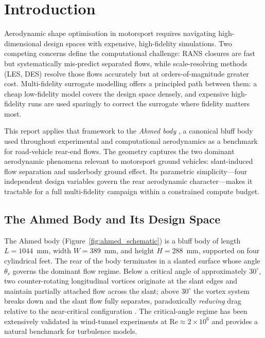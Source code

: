 \section{Introduction}
\label{sec:introduction}

Aerodynamic shape optimisation in motorsport requires navigating high-dimensional design spaces with expensive, high-fidelity simulations. Two competing concerns define the computational challenge: RANS closures are fast but systematically mis-predict separated flows, while scale-resolving methods (LES, DES) resolve those flows accurately but at orders-of-magnitude greater cost. Multi-fidelity surrogate modelling offers a principled path between them: a cheap low-fidelity model covers the design space densely, and expensive high-fidelity runs are used sparingly to correct the surrogate where fidelity matters most.

This report applies that framework to the \emph{Ahmed body} \cite{ahmed1984}, a canonical bluff body used throughout experimental and computational aerodynamics as a benchmark for road-vehicle rear-end flows. The geometry captures the two dominant aerodynamic phenomena relevant to motorsport ground vehicles: slant-induced flow separation and underbody ground effect. Its parametric simplicity---four independent design variables govern the rear aerodynamic character---makes it tractable for a full multi-fidelity campaign within a constrained compute budget.

\subsection{The Ahmed Body and Its Design Space}

The Ahmed body (Figure~\ref{fig:ahmed_schematic}) is a bluff body of length $L = 1044$~mm, width $W = 389$~mm, and height $H = 288$~mm, supported on four cylindrical feet. The rear of the body terminates in a slanted surface whose angle $\theta_s$ governs the dominant flow regime. Below a critical angle of approximately $30^\circ$, two counter-rotating longitudinal vortices originate at the slant edges and maintain partially attached flow across the slant; above $30^\circ$ the vortex system breaks down and the slant flow fully separates, paradoxically \emph{reducing} drag relative to the near-critical configuration \cite{lienhart2002}. The critical-angle regime has been extensively validated in wind-tunnel experiments at $\mathrm{Re}\approx2\times10^6$ and provides a natural benchmark for turbulence models.


